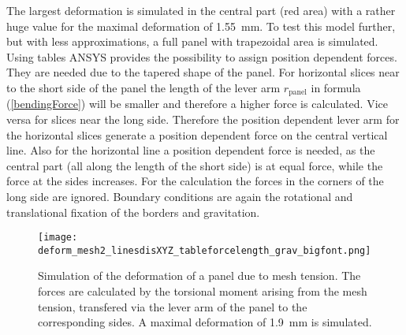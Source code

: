 \documentclass[
a4paper,                                %
twoside,                                %
BCOR1.4cm,                      %
10pt,                           %
headings=normal,                %
headsepline,                    %
clearplainpage, %
final,                                  %
div=14,
parskip=full,
openright,
bibliography=toc
]{scrreprt}
\begin{document}
The largest deformation is simulated in the central part (red area) with a rather huge value for the maximal deformation of \SI{1.55}{\mm}. To test this model further, but with less approximations, a full panel with trapezoidal area is simulated. Using tables ANSYS provides the possibility to assign position dependent forces. They are needed due to the tapered shape of the panel. For horizontal slices near to the short side of the panel the length of the lever arm $r_{\mathrm{panel}}$ in formula (\ref{bendingForce}) will be smaller and therefore a higher force is calculated. Vice versa for slices near the long side. Therefore the position dependent lever arm for the horizontal slices generate a position dependent force on the central vertical line. Also for the horizontal line a position dependent force is needed, as the central part (all along the length of the short side) is at equal force, while the force at the sides increases. For the calculation the forces in the corners of the long side are ignored. Boundary conditions are again the rotational and translational fixation of the borders and gravitation.

\begin{figure}[H]
	\centering
	\texttt{[image: deform\_mesh2\_linesdisXYZ\_tableforcelength\_grav\_bigfont.png]}
	\caption{Simulation of the deformation of a panel due to mesh tension. The forces are calculated by the torsional moment arising from the mesh tension, transfered via the lever arm of the panel to the corresponding sides. A maximal deformation of \SI{1.9}{\mm} is simulated.}
	\label{deformMeshSim2}
\end{figure}
\end{document}
